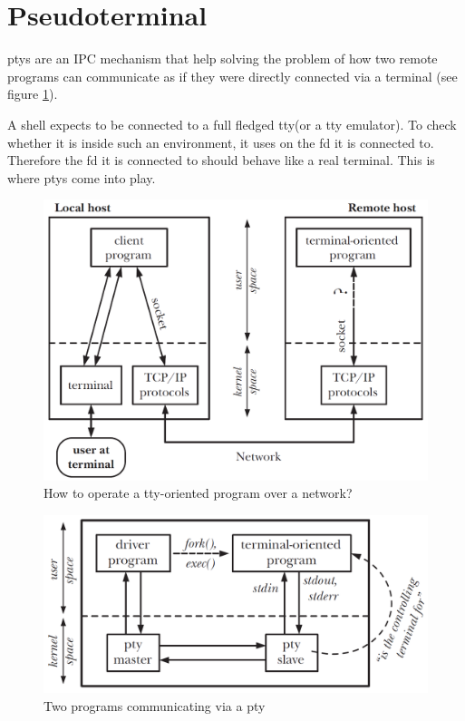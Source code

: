 \documentclass[10pt,a4paper,titlepage,twoside,english,final]{zhawreprt}
\begin{document}
\section{Pseudoterminal}\label{sec:ImplPseudoterminal}
\glspl{pty} are an \gls{IPC} mechanism that help solving the problem of how two remote programs can communicate as if they were directly connected via a \gls{terminal} (see figure \ref{fig:HowToOperateTtyOrientedProgramOverNetwork}).

A \gls{shell} expects to be connected to a full fledged \gls{tty}(or a \gls{tty} emulator).
To check whether it is inside such an environment, it uses \cite{isatty} on the \gls{fd} it is connected to.
Therefore the \gls{fd} it is connected to should behave like a real \gls{terminal}.
This is where \glspl{pty} come into play.

\begin{figure}[ht]
\includegraphics[width=\textwidth]{PseudoterminalProblem}
\caption{How to operate a \gls{tty}-oriented program over a network? \citep[p.1376]{KerriskTLPI}}
\label{fig:HowToOperateTtyOrientedProgramOverNetwork}
\end{figure}

\begin{figure}[ht]
\includegraphics[width=\textwidth]{Pseudoterminal}
\caption{Two programs communicating via a \gls{pty} \citep[p.1377]{KerriskTLPI}}
\label{fig:TwoProgramsCommunicatingViaAPty}
\end{figure}
\end{document}
